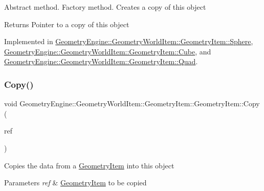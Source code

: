 Abstract method. Factory method. Creates a copy of this object \begin{DoxyReturn}{Returns}
Pointer to a copy of this object 
\end{DoxyReturn}


Implemented in \mbox{\hyperlink{class_geometry_engine_1_1_geometry_world_item_1_1_geometry_item_1_1_sphere_aaf5b7221c60ac1feefaacff14a20c1f3}{Geometry\+Engine\+::\+Geometry\+World\+Item\+::\+Geometry\+Item\+::\+Sphere}}, \mbox{\hyperlink{class_geometry_engine_1_1_geometry_world_item_1_1_geometry_item_1_1_cube_ab151cd962c45bc06d21e9e26c2d1c4aa}{Geometry\+Engine\+::\+Geometry\+World\+Item\+::\+Geometry\+Item\+::\+Cube}}, and \mbox{\hyperlink{class_geometry_engine_1_1_geometry_world_item_1_1_geometry_item_1_1_quad_ad3a6d04a38253d1f26735a87a53a5446}{Geometry\+Engine\+::\+Geometry\+World\+Item\+::\+Geometry\+Item\+::\+Quad}}.

\mbox{\label{class_geometry_engine_1_1_geometry_world_item_1_1_geometry_item_1_1_geometry_item_a13a2a225acb39c559601c2151b4322bf}} 
\subsubsection{\texorpdfstring{Copy()}{Copy()}}
{\footnotesize\ttfamily void Geometry\+Engine\+::\+Geometry\+World\+Item\+::\+Geometry\+Item\+::\+Geometry\+Item\+::\+Copy (\begin{DoxyParamCaption}\item[{const \mbox{\hyperlink{class_geometry_engine_1_1_geometry_world_item_1_1_geometry_item_1_1_geometry_item}{Geometry\+Item}} \&}]{ref }\end{DoxyParamCaption})\hspace{0.3cm}{\ttfamily [virtual]}}

Copies the data from a \mbox{\hyperlink{class_geometry_engine_1_1_geometry_world_item_1_1_geometry_item_1_1_geometry_item}{Geometry\+Item}} into this object 
\begin{DoxyParams}{Parameters}
{\em ref} & \mbox{\hyperlink{class_geometry_engine_1_1_geometry_world_item_1_1_geometry_item_1_1_geometry_item}{Geometry\+Item}} to be copied \\
\hline
\end{DoxyParams}
\mbox{\label{class_geometry_engine_1_1_geometry_world_item_1_1_geometry_item_1_1_geometry_item_a263a106b8c225c7e30f2788fb4a3e4bc}} 
